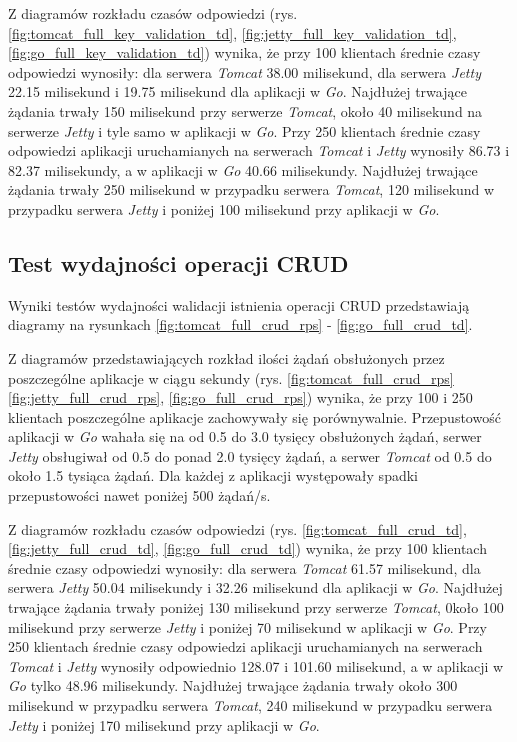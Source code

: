 Z diagramów rozkładu czasów odpowiedzi (rys. \ref{fig:tomcat_full_key_validation_td}, \ref{fig:jetty_full_key_validation_td}, \ref{fig:go_full_key_validation_td}) wynika, że przy 100 klientach średnie czasy odpowiedzi wynosiły: dla serwera \textsl{Tomcat} 38.00 milisekund, dla serwera \textsl{Jetty} 22.15 milisekund i 19.75 milisekund dla aplikacji w \textsl{Go}. Najdłużej trwające żądania trwały 150 milisekund przy serwerze  \textsl{Tomcat}, około 40 milisekund na serwerze \textsl{Jetty} i tyle samo w aplikacji w \textsl{Go}. Przy 250 klientach średnie czasy odpowiedzi aplikacji uruchamianych na serwerach \textsl{Tomcat} i \textsl{Jetty} wynosiły 86.73 i 82.37 milisekundy, a w aplikacji w \textsl{Go} 40.66 milisekundy. Najdłużej trwające żądania trwały 250 milisekund w przypadku serwera  \textsl{Tomcat}, 120 milisekund w przypadku serwera \textsl{Jetty} i poniżej 100  milisekund przy aplikacji w \textsl{Go}.

% 
\clearpage

\subsection{Test wydajności operacji CRUD}

Wyniki testów wydajności walidacji istnienia operacji CRUD przedstawiają diagramy na rysunkach \ref{fig:tomcat_full_crud_rps} - \ref{fig:go_full_crud_td}.

Z diagramów przedstawiających rozkład ilości żądań obsłużonych przez poszczególne aplikacje w ciągu sekundy (rys. \ref{fig:tomcat_full_crud_rps} \ref{fig:jetty_full_crud_rps}, \ref{fig:go_full_crud_rps}) wynika, że przy 100 i 250 klientach poszczególne aplikacje zachowywały się porównywalnie. Przepustowość aplikacji w \textsl{Go} wahała się na od 0.5 do 3.0 tysięcy obsłużonych żądań, serwer \textsl{Jetty} obsługiwał od 0.5 do ponad 2.0 tysięcy żądań, a serwer \textsl{Tomcat} od 0.5 do około 1.5 tysiąca żądań. Dla każdej z aplikacji występowały spadki przepustowości nawet poniżej 500 żądań/s.

Z diagramów rozkładu czasów odpowiedzi (rys. \ref{fig:tomcat_full_crud_td}, \ref{fig:jetty_full_crud_td}, \ref{fig:go_full_crud_td}) wynika, że przy 100 klientach średnie czasy odpowiedzi wynosiły: dla serwera \textsl{Tomcat} 61.57 milisekund, dla serwera \textsl{Jetty} 50.04 milisekundy i 32.26 milisekund dla aplikacji w \textsl{Go}. Najdłużej trwające żądania trwały poniżej 130 milisekund przy serwerze  \textsl{Tomcat}, 0koło 100 milisekund przy serwerze \textsl{Jetty} i poniżej 70 milisekund w aplikacji w \textsl{Go}. Przy 250 klientach średnie czasy odpowiedzi aplikacji uruchamianych na serwerach \textsl{Tomcat} i \textsl{Jetty}  wynosiły odpowiednio 128.07 i 101.60 milisekund, a w aplikacji w \textsl{Go} tylko 48.96 milisekundy. Najdłużej trwające żądania trwały około 300 milisekund w przypadku serwera  \textsl{Tomcat}, 240 milisekund w przypadku serwera \textsl{Jetty} i poniżej 170 milisekund przy aplikacji w \textsl{Go}.


